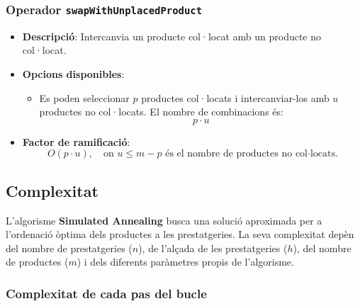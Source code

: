 \documentclass[a4paper,12pt]{report}
\begin{document}
\subsubsection{Operador \texttt{swapWithUnplacedProduct}}
\begin{itemize}
    \item \textbf{Descripció}: Intercanvia un producte col·locat amb un producte no col·locat.
    \item \textbf{Opcions disponibles}: 
    \begin{itemize}
        \item Es poden seleccionar \(p\) productes col·locats i intercanviar-los amb \(u\) productes no col·locats. El nombre de combinacions és:
        \[
        p \cdot u
        \]
    \end{itemize}
    \item \textbf{Factor de ramificació}:
    \[
    O(p \cdot u), \quad \text{on } u \leq m - p \text{ és el nombre de productes no col·locats.}
    \]
\end{itemize}

\subsection{Complexitat}

L'algorisme \textbf{Simulated Annealing} busca una solució aproximada per a l'ordenació òptima dels productes a les prestatgeries. La seva complexitat depèn del nombre de prestatgeries (\(n\)), de l'alçada de les prestatgeries (\(h\)), del nombre de productes (\(m\)) i dels diferents paràmetres propis de l'algorisme.

\subsubsection{Complexitat de cada pas del bucle}
\end{document}
